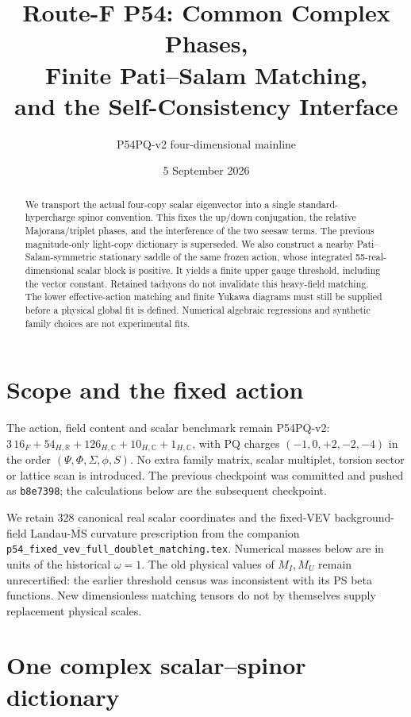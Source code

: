 \documentclass[11pt]{article}
\title{Route-F P54: Common Complex Phases,\\Finite Pati--Salam Matching,\\and the Self-Consistency Interface}
\author{P54PQ-v2 four-dimensional mainline}
\date{5 September 2026}
\newcommand{\MS}{\overline{\mathrm{MS}}}
\begin{document}
\maketitle
\begin{abstract}
We transport the actual four-copy scalar eigenvector into a single
standard-hypercharge spinor convention. This fixes the up/down conjugation,
the relative Majorana/triplet phases, and the interference of the two seesaw
terms. The previous magnitude-only light-copy dictionary is superseded.
We also construct a nearby Pati--Salam-symmetric stationary saddle of the
same frozen action, whose integrated 55-real-dimensional scalar block is
positive. It yields a finite upper gauge threshold, including the vector
constant. Retained tachyons do not invalidate this heavy-field matching.
The lower effective-action matching and finite Yukawa diagrams must still
be supplied before a physical global fit is defined. Numerical algebraic
regressions and synthetic family choices are not experimental fits.
\end{abstract}
\tableofcontents
\clearpage

\section{Scope and the fixed action}
The action, field content and scalar benchmark remain P54PQ-v2:
$3\,16_F+54_{H,\mathbb R}+126_{H,\mathbb C}+10_{H,\mathbb C}+1_{H,\mathbb C}$,
with PQ charges $(-1,0,+2,-2,-4)$ in the order
$(\Psi,\Phi,\Sigma,\phi,S)$. No extra family matrix, scalar multiplet,
torsion sector or lattice scan is introduced. The previous checkpoint was
committed and pushed as \texttt{b8e7398}; the calculations below are the
subsequent checkpoint.

We retain 328 canonical real scalar coordinates and the fixed-VEV
background-field Landau-$\MS$ curvature prescription from the companion
\texttt{p54\_fixed\_vev\_full\_doublet\_matching.tex}. Numerical masses below
are in units of the historical $\omega=1$. The old physical values of
$M_I,M_U$ remain unrecertified: the earlier threshold census was inconsistent
with its PS beta functions. New dimensionless matching tensors do not by
themselves supply replacement physical scales.

\section{One complex scalar--spinor dictionary}
\end{document}

